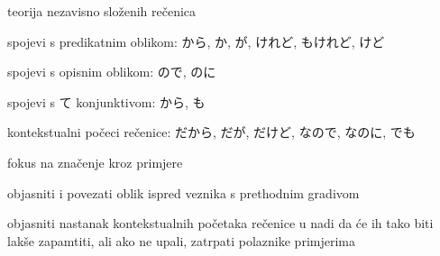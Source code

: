 
\author{Tomislav Mamić}

	
	
	\begin{hyou}
		\item teorija nezavisno složenih rečenica
		\item spojevi s predikatnim oblikom: から, か, が, けれど, もけれど, けど
		\item spojevi s opisnim oblikom: ので, のに
		\item spojevi s て konjunktivom: から, も
		\item kontekstualni počeci rečenice: だから, だが, だけど, なので, なのに, でも
	\end{hyou}

	
	\begin{hyou}
		\item fokus na značenje kroz primjere
		\item objasniti i povezati oblik ispred veznika s prethodnim gradivom
		\item objasniti nastanak kontekstualnih početaka rečenice u nadi da će ih tako biti lakše zapamtiti, ali ako ne upali, zatrpati polaznike primjerima
	\end{hyou}

